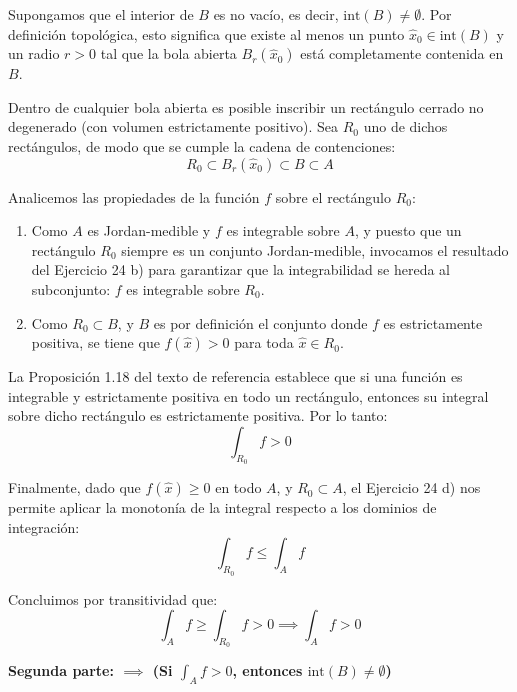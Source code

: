 \documentclass[11pt,letterpaper]{article}
\begin{document}
Supongamos que el interior de $B$ es no vacío, es decir, $\text{int}(B) \neq \emptyset$. Por definición topológica, esto significa que existe al menos un punto $\hat{x}_0 \in \text{int}(B)$ y un radio $r > 0$ tal que la bola abierta $B_r(\hat{x}_0)$ está completamente contenida en $B$.

Dentro de cualquier bola abierta es posible inscribir un rectángulo cerrado no degenerado (con volumen estrictamente positivo). Sea $R_0$ uno de dichos rectángulos, de modo que se cumple la cadena de contenciones:
\begin{equation*}
R_0 \subset B_r(\hat{x}_0) \subset B \subset A
\end{equation*}

Analicemos las propiedades de la función $f$ sobre el rectángulo $R_0$:
\begin{enumerate}
    \item Como $A$ es Jordan-medible y $f$ es integrable sobre $A$, y puesto que un rectángulo $R_0$ siempre es un conjunto Jordan-medible, invocamos el resultado del Ejercicio 24 b) para garantizar que la integrabilidad se hereda al subconjunto: $f$ es integrable sobre $R_0$.
    \item Como $R_0 \subset B$, y $B$ es por definición el conjunto donde $f$ es estrictamente positiva, se tiene que $f(\hat{x}) > 0$ para toda $\hat{x} \in R_0$.
\end{enumerate}

La Proposición 1.18 del texto de referencia establece que si una función es integrable y estrictamente positiva en todo un rectángulo, entonces su integral sobre dicho rectángulo es estrictamente positiva. Por lo tanto:
\begin{equation*}
\int_{R_0} f > 0
\end{equation*}

Finalmente, dado que $f(\hat{x}) \ge 0$ en todo $A$, y $R_0 \subset A$, el Ejercicio 24 d) nos permite aplicar la monotonía de la integral respecto a los dominios de integración:
\begin{equation*}
\int_{R_0} f \le \int_A f
\end{equation*}

Concluimos por transitividad que:
\begin{equation*}
\int_A f \ge \int_{R_0} f > 0 \implies \int_A f > 0
\end{equation*}

\vspace{0.5cm}
\textbf{Segunda parte: $\implies$ (Si $\int_A f > 0$, entonces $\text{int}(B) \neq \emptyset$)}
\end{document}
